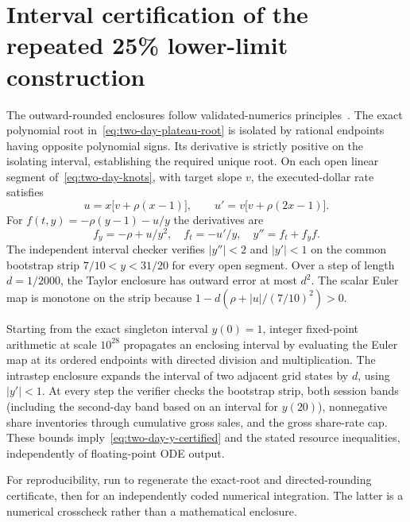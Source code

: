 \documentclass[review,hidelinks,onefignum,onetabnum]{siamonline250211}
\begin{document}
\section{Interval certification of the repeated 25\% lower-limit construction}
\label{app:two-day-cert}
The outward-rounded enclosures follow validated-numerics principles~\citep{Tucker2011}. The exact polynomial root in~\eqref{eq:two-day-plateau-root} is isolated by rational endpoints having opposite polynomial signs. Its derivative is strictly positive on the isolating interval, establishing the required unique root. On each open linear segment of~\eqref{eq:two-day-knots}, with target slope $v$, the executed-dollar rate satisfies
\[
u=x\big[v+\rho(x-1)\big],\qquad
u'=v\big[v+\rho(2x-1)\big].
\]
For $f(t,y)=-\rho(y-1)-u/y$ the derivatives are
\[
f_y=-\rho+u/y^2,\quad f_t=-u'/y,\quad
y''=f_t+f_yf.
\]
The independent interval checker verifies $|y''|<2$ and $|y'|<1$ on the common bootstrap strip $7/10<y<31/20$ for every open segment. Over a step of length $d=1/2000$, the Taylor enclosure has outward error at most $d^2$. The scalar Euler map is monotone on the strip because $1-d(\rho+|u|/(7/10)^2)>0$.

Starting from the exact singleton interval $y(0)=1$, integer fixed-point arithmetic at scale $10^{28}$ propagates an enclosing interval by evaluating the Euler map at its ordered endpoints with directed division and multiplication. The intrastep enclosure expands the interval of two adjacent grid states by $d$, using $|y'|<1$. At every step the verifier checks the bootstrap strip, both session bands (including the second-day band based on an interval for $y(20)$), nonnegative share inventories through cumulative gross sales, and the gross share-rate cap. These bounds imply~\eqref{eq:two-day-y-certified} and the stated resource inequalities, independently of floating-point ODE output.

For reproducibility, run  to regenerate the exact-root and directed-rounding certificate, then  for an independently coded numerical integration. The latter is a numerical crosscheck rather than a mathematical enclosure.
\end{document}
